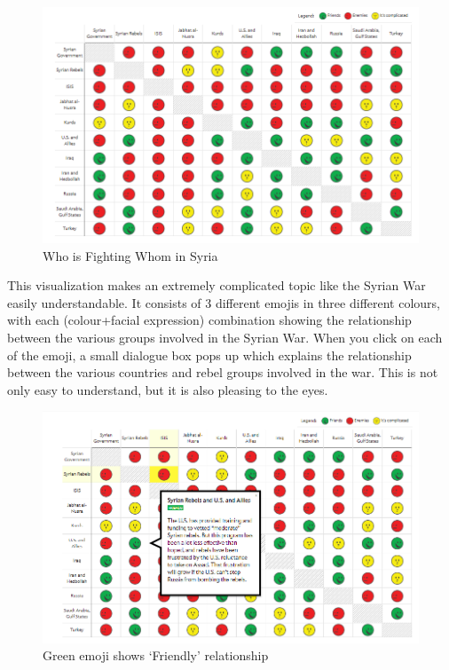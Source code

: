 \documentclass[]{book}
\theoremstyle{definition}
\theoremstyle{definition}
\theoremstyle{definition}
\theoremstyle{remark}
\begin{document}
\begin{figure}
\centering
\includegraphics{images/img_syria_summary.PNG}
\caption{Who is Fighting Whom in Syria}
\end{figure}

This visualization makes an extremely complicated topic like the Syrian
War easily understandable. It consists of 3 different emojis in three
different colours, with each (colour+facial expression) combination
showing the relationship between the various groups involved in the
Syrian War. When you click on each of the emoji, a small dialogue box
pops up which explains the relationship between the various countries
and rebel groups involved in the war. This is not only easy to
understand, but it is also pleasing to the eyes.

\begin{figure}
\centering
\includegraphics{images/img_syria_friendly.PNG}
\caption{Green emoji shows `Friendly' relationship}
\end{figure}
\end{document}
